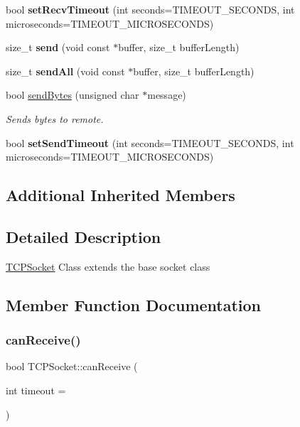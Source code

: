 \begin{DoxyCompactItemize}
bool {\bfseries set\+Recv\+Timeout} (int seconds=T\+I\+M\+E\+O\+U\+T\+\_\+\+S\+E\+C\+O\+N\+DS, int microseconds=T\+I\+M\+E\+O\+U\+T\+\_\+\+M\+I\+C\+R\+O\+S\+E\+C\+O\+N\+DS)
\item 
\mbox{\label{classTCPSocket_a3b9f4d4438c7e389f2c1ca5cc58d4b76}} 
size\+\_\+t {\bfseries send} (void const $\ast$buffer, size\+\_\+t buffer\+Length)
\item 
\mbox{\label{classTCPSocket_a47510691812384bfe2d644ceda80a06a}} 
size\+\_\+t {\bfseries send\+All} (void const $\ast$buffer, size\+\_\+t buffer\+Length)
\item 
bool \hyperlink{classTCPSocket_a2089125905ad6aae366d9a7e17b93c79}{send\+Bytes} (unsigned char $\ast$message)
\begin{DoxyCompactList}\small\item\em Sends bytes to remote. \end{DoxyCompactList}\item 
\mbox{\label{classTCPSocket_ac2ced635e31f0ba0d06cfbfd01479b5a}} 
bool {\bfseries set\+Send\+Timeout} (int seconds=T\+I\+M\+E\+O\+U\+T\+\_\+\+S\+E\+C\+O\+N\+DS, int microseconds=T\+I\+M\+E\+O\+U\+T\+\_\+\+M\+I\+C\+R\+O\+S\+E\+C\+O\+N\+DS)
\end{DoxyCompactItemize}
\subsection*{Additional Inherited Members}


\subsection{Detailed Description}
\hyperlink{classTCPSocket}{T\+C\+P\+Socket} Class extends the base socket class 



\subsection{Member Function Documentation}
\mbox{\label{classTCPSocket_a8f94fa439a6edf2366c1fcdd8ac9114b}} 
\subsubsection{\texorpdfstring{can\+Receive()}{canReceive()}}
{\footnotesize\ttfamily bool T\+C\+P\+Socket\+::can\+Receive (\begin{DoxyParamCaption}\item[{int}]{timeout = {} }\end{DoxyParamCaption})}



